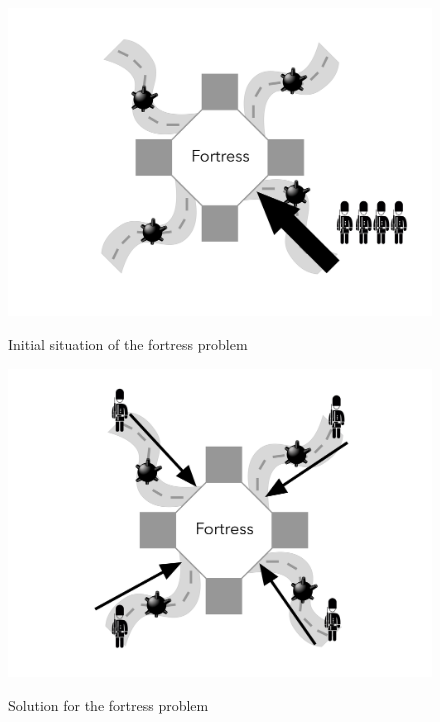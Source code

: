 \documentclass[12pt]{article}
\begin{document}
\begin{figure}[H]
    \centering
    \begin{minipage}[b]{0.45\textwidth}
    	\includegraphics[scale=0.06]{images/fortress_problem.png}
    	\caption{Initial situation of the fortress problem}
    	\centering
    	\label{fig:fortress}
    \end{minipage}
    \hfill
    \begin{minipage}[b]{0.45\textwidth}
    	\includegraphics[scale=0.06]{images/fortress_problem_solution.png}
    	\caption{Solution for the fortress problem}
    	\centering
    	\label{fig:fortress_solution}
    \end{minipage}
\end{figure}
\end{document}
